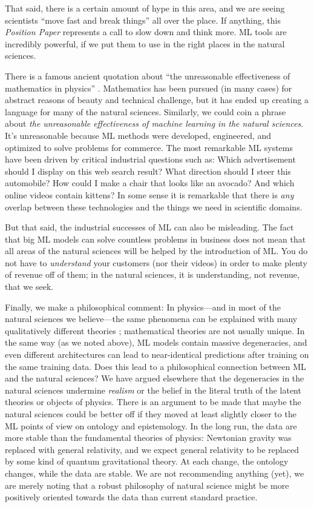 \documentclass[10pt]{article}
\newcommand{\documentname}{\textsl{Position Paper}}
\begin{document}
That said, there is a certain amount of hype in this area, and we are seeing scientists ``move fast and break things'' \cite{zuck} all over the place.
If anything, this \documentname{} represents a call to slow down and think more.
ML tools are incredibly powerful, if we put them to use in the right places in the natural sciences.

There is a famous ancient quotation about ``the unreasonable effectiveness of mathematics in physics'' \cite{weiner_maybe}.
Mathematics has been pursued (in many cases) for abstract reasons of beauty and technical challenge, but it has ended up creating a language for many of the natural sciences.
Similarly, we could coin a phrase about \emph{the unreasonable effectiveness of machine learning in the natural sciences}.
It's unreasonable because ML methods were developed, engineered, and optimized to solve problems for commerce.
The most remarkable ML systems have been driven by critical industrial questions such as:
Which advertisement should I display on this web search result?
What direction should I steer this automobile?
How could I make a chair that looks like an avocado?
And which online videos contain kittens?
In some sense it is remarkable that there is \emph{any} overlap between these technologies and the things we need in scientific domains.

But that said, the industrial successes of ML can also be misleading.
The fact that big ML models can solve countless problems in business does not mean that all areas of the natural sciences will be helped by the introduction of ML.
You do not have to \emph{understand} your customers (nor their videos) in order to make plenty of revenue off of them; in the natural sciences, it is understanding, not revenue, that we seek.

Finally, we make a philosophical comment:
In physics---and in most of the natural sciences we believe---the same phenomena can be explained with many qualitatively different theories \cite{philosphy_of_physics}; mathematical theories are not usually unique.
In the same way (as we noted above), ML models contain massive degeneracies, and even different architectures can lead to near-identical predictions after training on the same training data.
Does this lead to a philosophical connection between ML and the natural sciences?
We have argued elsewhere \cite{hogg} that the degeneracies in the natural sciences undermine \emph{realism} or the belief in the literal truth of the latent theories or objects of physics.
There is an argument to be made that maybe the natural sciences could be better off if they moved at least slightly closer to the ML points of view on ontology and epistemology.
In the long run, the data are more stable than the fundamental theories of physics:
Newtonian gravity was replaced with general relativity, and we expect general relativity to be replaced by some kind of quantum gravitational theory.
At each change, the ontology changes, while the data are stable.
We are not recommending anything (yet), we are merely noting that a robust philosophy of natural science might be more positively oriented towards the data than current standard practice.
\end{document}
